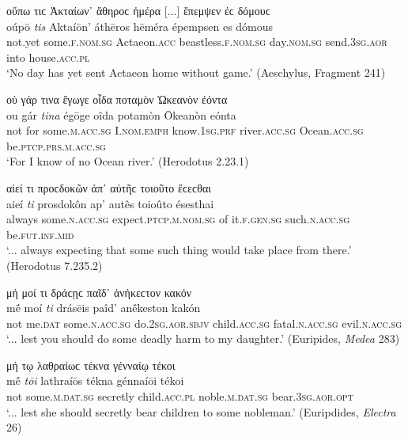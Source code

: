 \begin{exe}
\ex οὔπω τιϲ Ἀκταίων᾽ ἄθηροϲ ἡμέρα {[}...{]} ἔπεμψεν ἐϲ δόμουϲ\\
\gll oúpō \emph{tis} Aktaíōn' áthēros hēméra épempsen es dómous\\
not.yet some.\textsc{f.nom.sg} Actaeon.\textsc{acc} beastless.\textsc{f.nom.sg} day.\textsc{nom.sg} send.\textsc{3sg.aor} into house.\textsc{acc.pl}\\
\trans `No day has yet sent Actaeon home without game.' (Aeschylus, Fragment 241)
\label{tis15}
\end{exe}

\begin{exe}
\ex οὐ γάρ τινα ἔγωγε οἶδα ποταμὸν Ὠκεανὸν ἐόντα\\
\gll ou gár \emph{tina} égōge oîda potamòn Ōkeanòn eónta\\
not for some.\textsc{m.acc.sg} I.\textsc{nom.emph} know.\textsc{1sg.prf} river.\textsc{acc.sg} Ocean.\textsc{acc.sg} be.\textsc{ptcp.prs.m.acc.sg}\\
\trans `For I know of no Ocean river.' (Herodotus 2.23.1)
\label{tis16}
\end{exe}

\begin{exe}
\ex αἰεί τι προϲδοκῶν ἀπ᾽ αὐτῆϲ τοιοῦτο ἔϲεϲθαι\\
\gll aieí \emph{ti} prosdokôn ap' autês toioûto ésesthai\\
always some.\textsc{n.acc.sg} expect.\textsc{ptcp.m.nom.sg} of it.\textsc{f.gen.sg} such.\textsc{n.acc.sg} be.\textsc{fut.inf.mid}\\
\trans `... always expecting that some such thing would take place from there.' (Herodotus 7.235.2)
\label{tis17}
\end{exe}

\begin{exe}
\ex μή μοί τι δράϲῃϲ παῖδ᾽ ἀνήκεϲτον κακόν\\
\gll mḗ moí \emph{ti} drásēis paîd' anḗkeston kakón\\
not me.\textsc{dat} some.\textsc{n.acc.sg} do.\textsc{2sg.aor.sbjv} child.\textsc{acc.sg} fatal.\textsc{n.acc.sg} evil.\textsc{n.acc.sg}\\
\trans `... lest you should do some deadly harm to my daughter.' (Euripides, \textit{Medea} 283)
\label{tis18}
\end{exe}

\begin{exe}
\ex μή τῳ λαθραίωϲ τέκνα γένναίῳ τέκοι\\
\gll mḗ \emph{tōi} lathraíōs tékna génnaíōi tékoi\\
not some.\textsc{m.dat.sg} secretly child.\textsc{acc.pl} noble.\textsc{m.dat.sg} bear.\textsc{3sg.aor.opt}\\
\trans `... lest she should secretly bear children to some nobleman.' (Euripdides, \textit{Electra} 26)
\label{tis19}
\end{exe}

